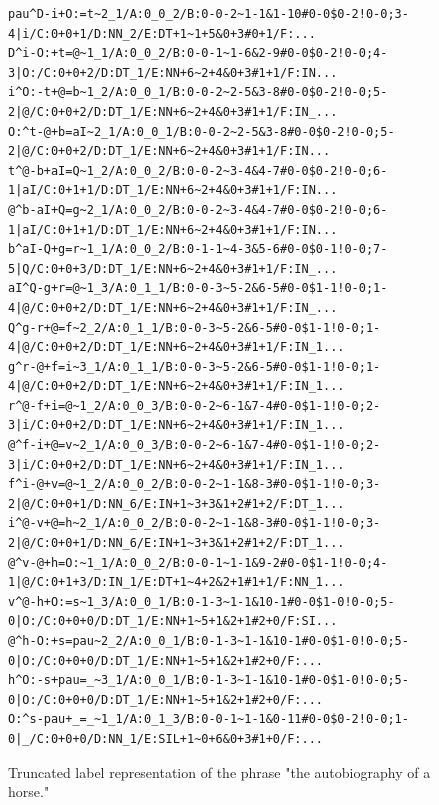 \begin{figure}[h]
\begin{lstlisting}[basicstyle=\tiny,frame=single]
pau^D-i+O:=t~2_1/A:0_0_2/B:0-0-2~1-1&1-10#0-0$0-2!0-0;3-4|i/C:0+0+1/D:NN_2/E:DT+1~1+5&0+3#0+1/F:...
D^i-O:+t=@~1_1/A:0_0_2/B:0-0-1~1-6&2-9#0-0$0-2!0-0;4-3|O:/C:0+0+2/D:DT_1/E:NN+6~2+4&0+3#1+1/F:IN...
i^O:-t+@=b~1_2/A:0_0_1/B:0-0-2~2-5&3-8#0-0$0-2!0-0;5-2|@/C:0+0+2/D:DT_1/E:NN+6~2+4&0+3#1+1/F:IN_...
O:^t-@+b=aI~2_1/A:0_0_1/B:0-0-2~2-5&3-8#0-0$0-2!0-0;5-2|@/C:0+0+2/D:DT_1/E:NN+6~2+4&0+3#1+1/F:IN...
t^@-b+aI=Q~1_2/A:0_0_2/B:0-0-2~3-4&4-7#0-0$0-2!0-0;6-1|aI/C:0+1+1/D:DT_1/E:NN+6~2+4&0+3#1+1/F:IN...
@^b-aI+Q=g~2_1/A:0_0_2/B:0-0-2~3-4&4-7#0-0$0-2!0-0;6-1|aI/C:0+1+1/D:DT_1/E:NN+6~2+4&0+3#1+1/F:IN...
b^aI-Q+g=r~1_1/A:0_0_2/B:0-1-1~4-3&5-6#0-0$0-1!0-0;7-5|Q/C:0+0+3/D:DT_1/E:NN+6~2+4&0+3#1+1/F:IN_...
aI^Q-g+r=@~1_3/A:0_1_1/B:0-0-3~5-2&6-5#0-0$1-1!0-0;1-4|@/C:0+0+2/D:DT_1/E:NN+6~2+4&0+3#1+1/F:IN_...
Q^g-r+@=f~2_2/A:0_1_1/B:0-0-3~5-2&6-5#0-0$1-1!0-0;1-4|@/C:0+0+2/D:DT_1/E:NN+6~2+4&0+3#1+1/F:IN_1...
g^r-@+f=i~3_1/A:0_1_1/B:0-0-3~5-2&6-5#0-0$1-1!0-0;1-4|@/C:0+0+2/D:DT_1/E:NN+6~2+4&0+3#1+1/F:IN_1...
r^@-f+i=@~1_2/A:0_0_3/B:0-0-2~6-1&7-4#0-0$1-1!0-0;2-3|i/C:0+0+2/D:DT_1/E:NN+6~2+4&0+3#1+1/F:IN_1...
@^f-i+@=v~2_1/A:0_0_3/B:0-0-2~6-1&7-4#0-0$1-1!0-0;2-3|i/C:0+0+2/D:DT_1/E:NN+6~2+4&0+3#1+1/F:IN_1...
f^i-@+v=@~1_2/A:0_0_2/B:0-0-2~1-1&8-3#0-0$1-1!0-0;3-2|@/C:0+0+1/D:NN_6/E:IN+1~3+3&1+2#1+2/F:DT_1...
i^@-v+@=h~2_1/A:0_0_2/B:0-0-2~1-1&8-3#0-0$1-1!0-0;3-2|@/C:0+0+1/D:NN_6/E:IN+1~3+3&1+2#1+2/F:DT_1...
@^v-@+h=O:~1_1/A:0_0_2/B:0-0-1~1-1&9-2#0-0$1-1!0-0;4-1|@/C:0+1+3/D:IN_1/E:DT+1~4+2&2+1#1+1/F:NN_1...
v^@-h+O:=s~1_3/A:0_0_1/B:0-1-3~1-1&10-1#0-0$1-0!0-0;5-0|O:/C:0+0+0/D:DT_1/E:NN+1~5+1&2+1#2+0/F:SI...
@^h-O:+s=pau~2_2/A:0_0_1/B:0-1-3~1-1&10-1#0-0$1-0!0-0;5-0|O:/C:0+0+0/D:DT_1/E:NN+1~5+1&2+1#2+0/F:...
h^O:-s+pau=_~3_1/A:0_0_1/B:0-1-3~1-1&10-1#0-0$1-0!0-0;5-0|O:/C:0+0+0/D:DT_1/E:NN+1~5+1&2+1#2+0/F:...
O:^s-pau+_=_~1_1/A:0_1_3/B:0-0-1~1-1&0-11#0-0$0-2!0-0;1-0|_/C:0+0+0/D:NN_1/E:SIL+1~0+6&0+3#1+0/F:...
\end{lstlisting}
    \caption{Truncated label representation of the phrase "the autobiography of a horse."}
    \label{fig:sentence-lab}
\end{figure}


